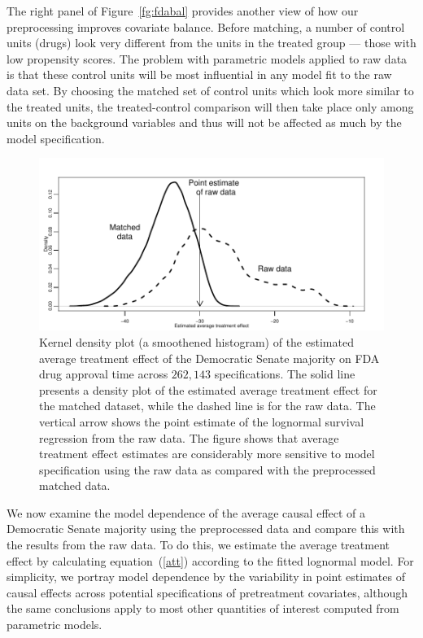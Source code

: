 \documentclass[11pt,titlepage]{article}
\begin{document}
The right panel of Figure~\ref{fg:fdabal} provides another view of how
our preprocessing improves covariate balance.  Before matching, a
number of control units (drugs) look very different from the units in
the treated group --- those with low propensity scores.  The problem
with parametric models applied to raw data is that these control units
will be most influential in any model fit to the raw data set.  By
choosing the matched set of control units which look more similar to
the treated units, the treated-control comparison will then take place
only among units on the background variables and thus will not be
affected as much by the model specification.
\begin{figure}[t] 
 \begin{center}
   \includegraphics{figs/fdadens.pdf}
  \end{center}
  \vspace{-0.275in}
  \caption{Kernel density plot (a smoothened histogram)
    of the estimated average treatment effect of the Democratic Senate
    majority on FDA drug approval time across $262,143$
    specifications. The solid line presents a density plot of the
    estimated average treatment effect for the matched dataset, while
    the dashed line is for the raw data.  The vertical arrow shows the
    point estimate of the lognormal survival regression from the raw
    data.  The figure shows that average treatment effect estimates
    are considerably more sensitive to model specification using the
    raw data as compared with the preprocessed matched data.}
  \label{fg:fdadens}
\end{figure}

We now examine the model dependence of the average causal effect of a
Democratic Senate majority using the preprocessed data and compare
this with the results from the raw data.  To do this, we estimate the
average treatment effect by calculating equation~(\ref{att}) according
to the fitted lognormal model.  For simplicity, we portray model
dependence by the variability in point estimates of causal effects
across potential specifications of pretreatment covariates, although
the same conclusions apply to most other quantities of interest
computed from parametric models.
\end{document}
